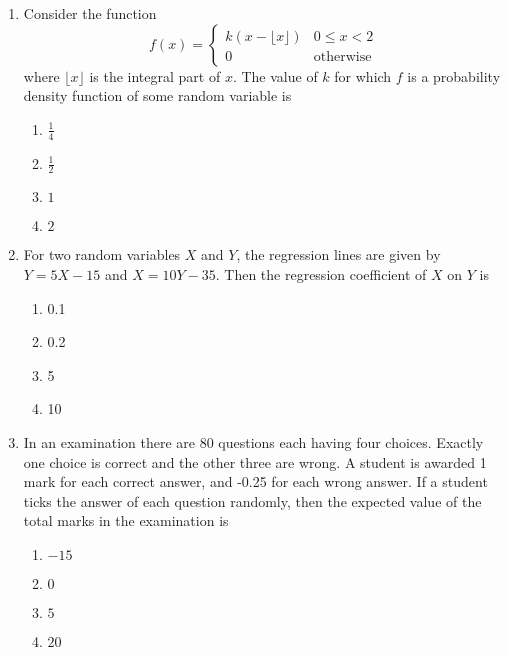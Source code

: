 \documentclass[journal]{IEEEtran}
\numberwithin{equation}{enumi}
\numberwithin{figure}{enumi}
\begin{document}
\begin{enumerate}
\item
Consider the function
\[
f(x) = 
\begin{cases}
k(x - \lfloor x \rfloor) & 0 \leq x < 2 \\
0 & \text{otherwise}
\end{cases}
\]
where $\lfloor x \rfloor$ is the integral part of $x$. The value of $k$ for which $f$ is a probability density function of some random variable is
\hfill{}
\begin{multicols}{4}
\begin{enumerate}
    \item $\frac{1}{4}$
    \item $\frac{1}{2}$
    \item $1$
    \item $2$
\end{enumerate}
\end{multicols}

\item
For two random variables $X$ and $Y$, the regression lines are given by $Y = 5X - 15$ and $X = 10Y - 35$. Then the regression coefficient of $X$ on $Y$ is
\hfill{}
\begin{multicols}{4}
\begin{enumerate}
    \item 0.1
    \item 0.2
    \item 5
    \item 10
\end{enumerate}
\end{multicols}

\item
In an examination there are 80 questions each having four choices. Exactly one choice is correct and the other three are wrong. A student is awarded 1 mark for each correct answer, and -0.25 for each wrong answer. If a student ticks the answer of each question randomly, then the expected value of the total marks in the examination is
\hfill{}
\begin{multicols}{4}
\begin{enumerate}
    \item $-15$
    \item $0$
    \item $5$
    \item $20$
\end{enumerate}
\end{multicols}


\end{enumerate}
\end{document}
